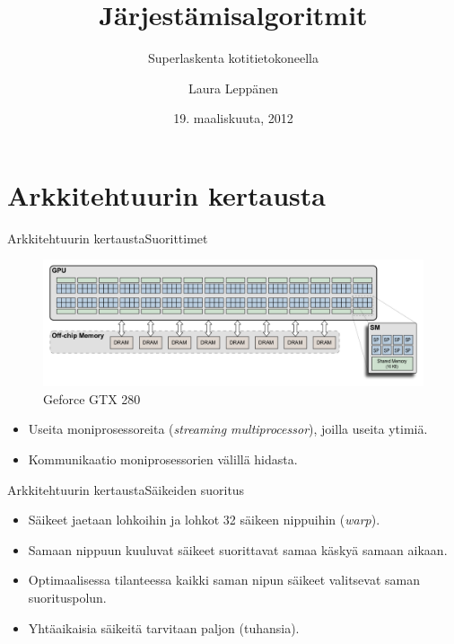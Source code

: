 \documentclass{beamer}
\title{Järjestämisalgoritmit}
\subtitle{Superlaskenta kotitietokoneella}
\author{Laura Leppänen}
\date{19. maaliskuuta, 2012}
\begin{document}
\begin{frame}
\titlepage
\end{frame}

\section{Arkkitehtuurin kertausta}

\begin{frame}{Arkkitehtuurin kertausta}{Suorittimet}
  \begin{figure}
    \includegraphics[scale=0.25]{geforce_gtx280.png}
    \caption{Geforce GTX 280}
  \end{figure}

  \begin{itemize}
  \item
    Useita moniprosessoreita (\emph{streaming multiprocessor}), joilla useita ytimiä.
  \item
    Kommunikaatio moniprosessorien välillä hidasta.
  \end{itemize}
\end{frame}

\begin{frame}{Arkkitehtuurin kertausta}{Säikeiden suoritus}
    \begin{itemize}
    \item
    Säikeet jaetaan lohkoihin ja lohkot 32 säikeen nippuihin (\emph{warp}).
    \item
      Samaan nippuun kuuluvat säikeet suorittavat samaa käskyä samaan aikaan.
    \item
      Optimaalisessa tilanteessa kaikki saman nipun säikeet valitsevat saman suorituspolun.
    \item
      Yhtäaikaisia säikeitä tarvitaan paljon (tuhansia).
    \end{itemize}
\end{frame}
\end{document}
